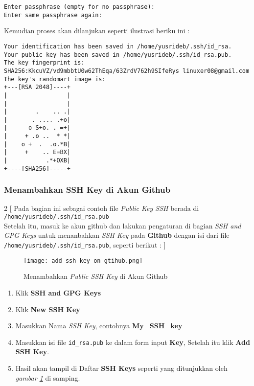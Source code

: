 \begin{lstlisting}[language=ShellBash]
Enter passphrase (empty for no passphrase):
Enter same passphrase again: 
\end{lstlisting}

\noindent
Kemudian proses akan dilanjukan seperti ilustrasi beriku ini :

\begin{lstlisting}[language=ShellBash]
Your identification has been saved in /home/yusrideb/.ssh/id_rsa.
Your public key has been saved in /home/yusrideb/.ssh/id_rsa.pub.
The key fingerprint is:
SHA256:KkcuVZ/vd9mbbtU0w62ThEqa/63ZrdV762h9SIfeRys linuxer08@gmail.com
The key's randomart image is:
+---[RSA 2048]----+
|                 |
|                 |
|        .    .. .|
|       . .... .+o|
|      o S+o. . =+|
|     + .o ..  * *|
|    o +  .  .o.*B|
|     +    .. E=BX|
|           .*+OXB|
+----[SHA256]-----+
\end{lstlisting}

\pagebreak
\subsubsection{Menambahkan SSH Key di Akun Github}

\begin{multicols}{2}
[
\noindent
Pada bagian ini sebagai contoh file \textit{Public Key SSH} berada di\\ \texttt{/home/yusrideb/.ssh/id\_rsa.pub}\\
Setelah itu, masuk ke akun github dan lakukan pengaturan di bagian \textit{SSH and GPG Keys} untuk menanbahkan \textit{SSH Key} pada \textbf{Github} dengan isi dari file\\ \texttt{/home/yusrideb/.ssh/id\_rsa.pub}, seperti berikut :
]
\begin{figure}[H]
	\centering
	\texttt{[image: add-ssh-key-on-gtihub.png]}
	\caption{Menambahkan \textit{Public SSH Key} di Akun Github}
	\label{fig:bab2_add-ssh-key-on-github}
\end{figure}

\begin{enumerate}
	\item Klik \textbf{SSH and GPG Keys}
	
	\item Klik \textbf{New SSH Key}
	
	\item Masukkan Nama \textit{SSH Key}, contohnya \textbf{My\_SSH\_key}
	
	\item Masukkan isi file \texttt{id\_rsa.pub} ke dalam form input \textbf{Key},
	Setelah itu klik \textbf{Add SSH Key}.
	
	\item Hasil akan tampil di Daftar \textbf{SSH Keys} seperti yang ditunjukkan oleh \textit{gambar \ref{fig:bab2_add-ssh-key-on-github}} di samping.
\end{enumerate}

\end{multicols}

